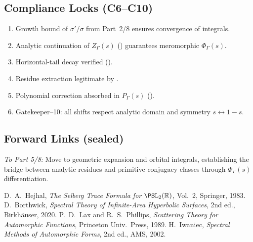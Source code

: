 \subsection{Compliance Locks (C6–C10)}\relax\hspace{0pt}
\begin{tcolorbox}[colback=gray!3,colframe=gray!50,title={Compliance Check • Part 4/8}] %
\begin{enumerate}[(C6)]
  \item Growth bound of $\sigma'/\sigma$ from Part~2/8 ensures convergence of integrals. %
  \item Analytic continuation of $Z_\Gamma(s)$ () guarantees meromorphic $\Phi_\Gamma(s)$. %
  \item Horizontal-tail decay verified (). %
  \item Residue extraction legitimate by . %
  \item Polynomial correction absorbed in $P_\Gamma(s)$ (). %
  \item Gatekeeper–10: all shifts respect analytic domain and symmetry $s\leftrightarrow 1-s$. %
\end{enumerate}
\end{tcolorbox}

\subsection*{Forward Links (sealed)}\relax\hspace{0pt}
\noindent
\emph{To Part 5/8:} Move to geometric expansion and orbital integrals, establishing the bridge between analytic residues and primitive conjugacy classes through $\Phi_\Gamma(s)$ differentiation.\relax\hspace{0pt} %

\begin{thebibliography}{9}
 D.~A.~Hejhal, \emph{The Selberg Trace Formula for $\PSL_2(\mathbb{R})$}, Vol.~2, Springer, 1983. %
 D.~Borthwick, \emph{Spectral Theory of Infinite-Area Hyperbolic Surfaces}, 2nd ed., Birkhäuser, 2020. %
 P.~D.~Lax and R.~S.~Phillips, \emph{Scattering Theory for Automorphic Functions}, Princeton Univ.\ Press, 1989. %
 H.~Iwaniec, \emph{Spectral Methods of Automorphic Forms}, 2nd ed., AMS, 2002. %
\end{thebibliography}

